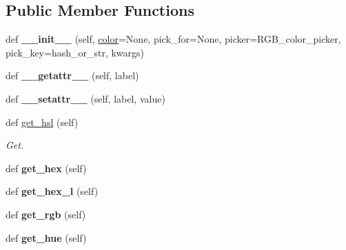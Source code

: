 \subsection*{Public Member Functions}
\begin{DoxyCompactItemize}
\item 
\hypertarget{classcolour_1_1Color_acaacc23a6538d6bb8e5327a178bd8ed6}{}def {\bfseries \+\_\+\+\_\+init\+\_\+\+\_\+} (self, \hyperlink{structcolor}{color}=None, pick\+\_\+for=None, picker=R\+G\+B\+\_\+color\+\_\+picker, pick\+\_\+key=hash\+\_\+or\+\_\+str, kwargs)\label{classcolour_1_1Color_acaacc23a6538d6bb8e5327a178bd8ed6}

\item 
\hypertarget{classcolour_1_1Color_a8fff35bebd9fece5a01a7906bd69094e}{}def {\bfseries \+\_\+\+\_\+getattr\+\_\+\+\_\+} (self, label)\label{classcolour_1_1Color_a8fff35bebd9fece5a01a7906bd69094e}

\item 
\hypertarget{classcolour_1_1Color_a63b6606a491b081da36dd350f181870e}{}def {\bfseries \+\_\+\+\_\+setattr\+\_\+\+\_\+} (self, label, value)\label{classcolour_1_1Color_a63b6606a491b081da36dd350f181870e}

\item 
def \hyperlink{classcolour_1_1Color_aa1d8e0def73bf271d12f964609c1eba3}{get\+\_\+hsl} (self)
\begin{DoxyCompactList}\small\item\em Get. \end{DoxyCompactList}\item 
\hypertarget{classcolour_1_1Color_ad8bfc766aa83c37bd115d66f9dce8ffa}{}def {\bfseries get\+\_\+hex} (self)\label{classcolour_1_1Color_ad8bfc766aa83c37bd115d66f9dce8ffa}

\item 
\hypertarget{classcolour_1_1Color_abfdd0669ccebcb69919d21686ab072ab}{}def {\bfseries get\+\_\+hex\+\_\+l} (self)\label{classcolour_1_1Color_abfdd0669ccebcb69919d21686ab072ab}

\item 
\hypertarget{classcolour_1_1Color_a914307dd0d4427bd99a30a888849b42e}{}def {\bfseries get\+\_\+rgb} (self)\label{classcolour_1_1Color_a914307dd0d4427bd99a30a888849b42e}

\item 
\hypertarget{classcolour_1_1Color_a4dd18006c4139d055c2ced25fd9d6dea}{}def {\bfseries get\+\_\+hue} (self)\label{classcolour_1_1Color_a4dd18006c4139d055c2ced25fd9d6dea}


\end{DoxyCompactItemize}

